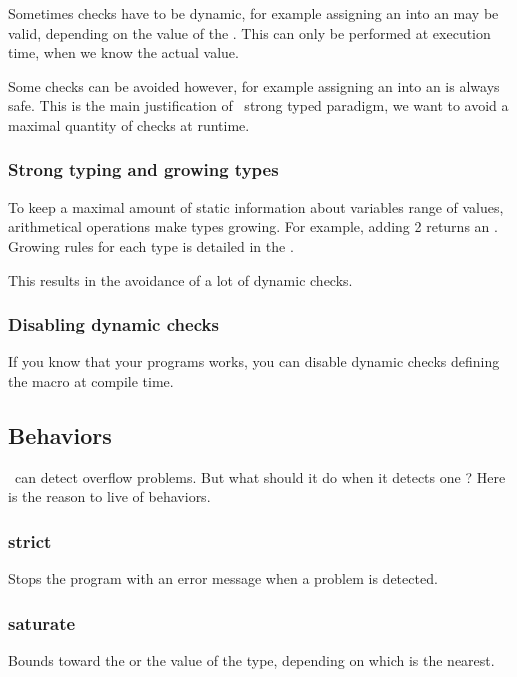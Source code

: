 Sometimes checks have to be dynamic, for example assigning an
 into an  may be valid, depending on the
value of the . This can only be performed at execution
time, when we know the actual value.

Some checks can be avoided however, for example assigning an
 into an  is always safe. This is the main
justification of \integre\ strong typed paradigm, we want to avoid a
maximal quantity of checks at runtime.

\subsubsection{Strong typing and growing types}

To keep a maximal amount of static information about variables
range of values, arithmetical operations make types growing. For
example, adding 2  returns an . Growing
rules for each type is detailed in the .

This results in the avoidance of a lot of dynamic checks.

\subsubsection{Disabling dynamic checks}

If you know that your programs works, you can disable dynamic checks
defining the macro  at compile time.

\subsection{Behaviors}

\integre\ can detect overflow problems. But what should it do when it
detects one ? Here is the reason to live of behaviors.

\subsubsection{strict}

Stops the program with an error message when a problem is detected.

\subsubsection{saturate}

Bounds toward the  or the  value of the type,
depending on which is the nearest.

